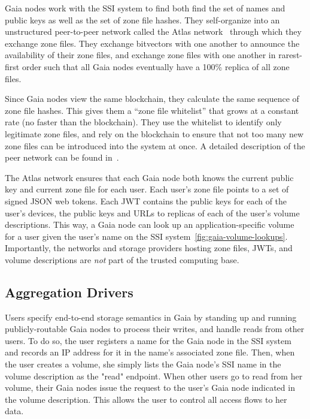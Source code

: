 Gaia nodes work with the SSI system to find both find the set of names and public keys
as well as the set of zone file hashes.  They self-organize into an unstructured
peer-to-peer network called the Atlas network~\cite{blockstack-white-paper}
through which they exchange zone files.  They exchange
bitvectors with one another to announce the availability of their zone files,
and exchange zone files with one another in rarest-first order such that all
Gaia nodes eventually have a 100\% replica of all zone files.

Since Gaia nodes view the same blockchain, they calculate the same sequence of zone
file hashes.  This gives them a ``zone file whitelist'' that grows at a constant
rate (no faster than the blockchain).  They use the whitelist to identify only
legitimate zone files, and rely on the blockchain to ensure that not too many
new zone files can be introduced into the system at once.  A detailed
description of the peer network can be found in~\cite{ali2017}.


The Atlas network ensures that each Gaia node both knows the current public key
and current zone file for each user.  Each user's
zone file points to a set of signed JSON web tokens.  Each JWT contains the
public keys for each of the user's devices, the public keys and URLs to
replicas of each of the user's volume descriptions.  This way, a Gaia node can
look up an application-specific volume for a user given the user's name on the
SSI system~\ref{fig:gaia-volume-lookups}.  Importantly, the networks and storage
providers hosting zone files, JWTs, and volume descriptions are \emph{not} part
of the trusted computing base.

\subsection{Aggregation Drivers}

Users specify end-to-end storage semantics in Gaia by standing up and running
publicly-routable Gaia nodes to process their writes, and handle reads from
other users.  To do so, the user registers a name for the Gaia node in the SSI
system and records an IP address for it in the name's associated zone file.
Then, when the user creates a volume, she simply lists the Gaia node's SSI name
in the volume description as the "read" endpoint.  When other users go to
read from her volume, their Gaia nodes issue the request to the user's Gaia node
indicated in the volume description.  This allows the user to control all access
flows to her data.

